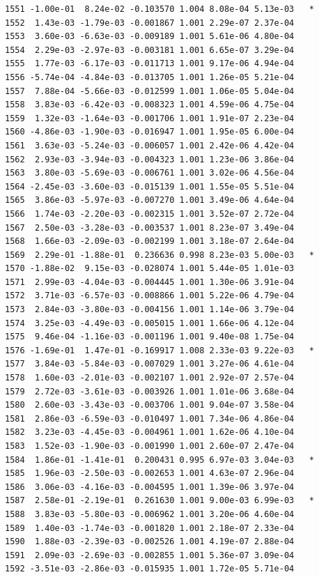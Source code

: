 \documentclass[
  letterpaper,
  DIV=11,
  numbers=noendperiod]{scrartcl}
\begin{document}
\begin{verbatim}
1551 -1.00e-01  8.24e-02 -0.103570 1.004 8.08e-04 5.13e-03   *
1552  1.43e-03 -1.79e-03 -0.001867 1.001 2.29e-07 2.37e-04    
1553  3.60e-03 -6.63e-03 -0.009189 1.001 5.61e-06 4.80e-04    
1554  2.29e-03 -2.97e-03 -0.003181 1.001 6.65e-07 3.29e-04    
1555  1.77e-03 -6.17e-03 -0.011713 1.001 9.17e-06 4.94e-04    
1556 -5.74e-04 -4.84e-03 -0.013705 1.001 1.26e-05 5.21e-04    
1557  7.88e-04 -5.66e-03 -0.012599 1.001 1.06e-05 5.04e-04    
1558  3.83e-03 -6.42e-03 -0.008323 1.001 4.59e-06 4.75e-04    
1559  1.32e-03 -1.64e-03 -0.001706 1.001 1.91e-07 2.23e-04    
1560 -4.86e-03 -1.90e-03 -0.016947 1.001 1.95e-05 6.00e-04    
1561  3.63e-03 -5.24e-03 -0.006057 1.001 2.42e-06 4.42e-04    
1562  2.93e-03 -3.94e-03 -0.004323 1.001 1.23e-06 3.86e-04    
1563  3.80e-03 -5.69e-03 -0.006761 1.001 3.02e-06 4.56e-04    
1564 -2.45e-03 -3.60e-03 -0.015139 1.001 1.55e-05 5.51e-04    
1565  3.86e-03 -5.97e-03 -0.007270 1.001 3.49e-06 4.64e-04    
1566  1.74e-03 -2.20e-03 -0.002315 1.001 3.52e-07 2.72e-04    
1567  2.50e-03 -3.28e-03 -0.003537 1.001 8.23e-07 3.49e-04    
1568  1.66e-03 -2.09e-03 -0.002199 1.001 3.18e-07 2.64e-04    
1569  2.29e-01 -1.88e-01  0.236636 0.998 8.23e-03 5.00e-03   *
1570 -1.88e-02  9.15e-03 -0.028074 1.001 5.44e-05 1.01e-03    
1571  2.99e-03 -4.04e-03 -0.004445 1.001 1.30e-06 3.91e-04    
1572  3.71e-03 -6.57e-03 -0.008866 1.001 5.22e-06 4.79e-04    
1573  2.84e-03 -3.80e-03 -0.004156 1.001 1.14e-06 3.79e-04    
1574  3.25e-03 -4.49e-03 -0.005015 1.001 1.66e-06 4.12e-04    
1575  9.46e-04 -1.16e-03 -0.001196 1.001 9.40e-08 1.75e-04    
1576 -1.69e-01  1.47e-01 -0.169917 1.008 2.33e-03 9.22e-03   *
1577  3.84e-03 -5.84e-03 -0.007029 1.001 3.27e-06 4.61e-04    
1578  1.60e-03 -2.01e-03 -0.002107 1.001 2.92e-07 2.57e-04    
1579  2.72e-03 -3.61e-03 -0.003926 1.001 1.01e-06 3.68e-04    
1580  2.60e-03 -3.43e-03 -0.003706 1.001 9.04e-07 3.58e-04    
1581  2.86e-03 -6.59e-03 -0.010497 1.001 7.34e-06 4.86e-04    
1582  3.23e-03 -4.45e-03 -0.004961 1.001 1.62e-06 4.10e-04    
1583  1.52e-03 -1.90e-03 -0.001990 1.001 2.60e-07 2.47e-04    
1584  1.86e-01 -1.41e-01  0.200431 0.995 6.97e-03 3.04e-03   *
1585  1.96e-03 -2.50e-03 -0.002653 1.001 4.63e-07 2.96e-04    
1586  3.06e-03 -4.16e-03 -0.004595 1.001 1.39e-06 3.97e-04    
1587  2.58e-01 -2.19e-01  0.261630 1.001 9.00e-03 6.99e-03   *
1588  3.83e-03 -5.80e-03 -0.006962 1.001 3.20e-06 4.60e-04    
1589  1.40e-03 -1.74e-03 -0.001820 1.001 2.18e-07 2.33e-04    
1590  1.88e-03 -2.39e-03 -0.002526 1.001 4.19e-07 2.88e-04    
1591  2.09e-03 -2.69e-03 -0.002855 1.001 5.36e-07 3.09e-04    
1592 -3.51e-03 -2.86e-03 -0.015935 1.001 1.72e-05 5.71e-04    

\end{verbatim}
\end{document}
